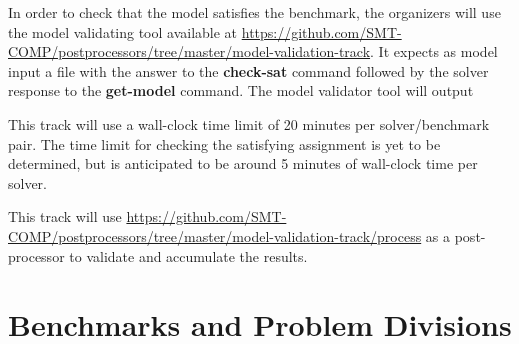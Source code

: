 \documentclass[12pt]{article}
\newcommand{\akey}[1]{\textbf{#1}\xspace}
\begin{document}
In order to check that the model satisfies the benchmark, the organizers will
use the model validating tool available at
{\url{https://github.com/SMT-COMP/postprocessors/tree/master/model-validation-track}}.
It expects as model input a file with the answer to the \akey{check-sat}
command followed by the solver response to the \akey{get-model} command.
The model validator tool will output

This track will use a wall-clock time limit of 20 minutes per solver/benchmark
pair. The time limit for checking the satisfying assignment is yet to be
determined, but is anticipated to be around 5 minutes of wall-clock time per
solver.

This track will use
{\url{https://github.com/SMT-COMP/postprocessors/tree/master/model-validation-track/process}}
as a post-processor
to validate and accumulate the results.


\section{Benchmarks and Problem Divisions}
\end{document}
